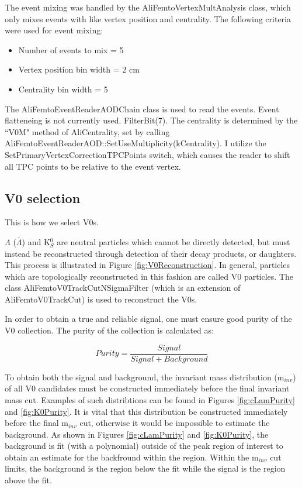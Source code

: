 \documentclass[ALICE,manyauthors]{cernphprep}
\begin{document}
The event mixing was handled by the AliFemtoVertexMultAnalysis class, which only mixes events with like vertex position and centrality.
The following criteria were used for event mixing:

\begin{itemize}
 \itemsep0em
 \item Number of events to mix = 5
 \item Vertex position bin width = 2 cm
 \item Centrality bin width = 5%
\end{itemize}

The AliFemtoEventReaderAODChain class is used to read the events.
Event flatteneing is not currently used.
FilterBit(7).
The centrality is determined by the ``V0M" method of AliCentrality, set by calling AliFemtoEventReaderAOD::SetUseMultiplicity(kCentrality).
I utilize the SetPrimaryVertexCorrectionTPCPoints switch, which causes the reader to shift all TPC points to be relative to the event vertex.







\subsection{V0 selection}
\label{sec:V0Selection}
This is how we select V0s.

$\Lambda$ ($\bar{\Lambda}$) and K$^{0}_{S}$ are neutral particles which cannot be directly detected, but must instead be reconstructed through detection of their decay products, or daughters.  
This process is illustrated in Figure \ref{fig:V0Reconstruction}.
In general, particles which are topologically reconstructed in this fashion are called V0 particles.
The class AliFemtoV0TrackCutNSigmaFilter (which is an extension of AliFemtoV0TrackCut) is used to reconstruct the V0s.

In order to obtain a true and reliable signal, one must ensure good purity of the V0 collection.  The purity of the collection is calculated as:

\begin{equation}
 Purity = \frac{Signal}{Signal + Background}
\label{eqn:Purity}
\end{equation}

To obtain both the signal and background, the invariant mass distribution (m$_{inv}$) of all V0 candidates must be constructed immediately before the final invariant mass cut.
Examples of such distribtions can be found in Figures \ref{fig:cLamPurity} and \ref{fig:K0Purity}.
It is vital that this distribution be constructed immediately before the final m$_{inv}$ cut, otherwise it would be impossible to estimate the background.
As shown in Figures \ref{fig:cLamPurity} and \ref{fig:K0Purity}, the background is fit (with a polynomial) outside of the peak region of interest to obtain an estimate for the backfround within the region.
Within the m$_{inv}$ cut limits, the background is the region below the fit while the signal is the region above the fit.
\end{document}
